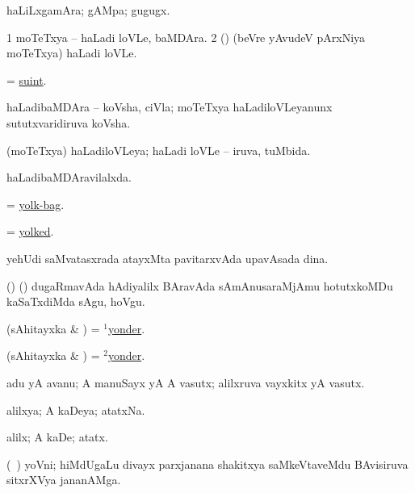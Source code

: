 \bentry
{} 
\gl{\nA} 
\bmng
haLiLxgamAra; gAMpa; gugugx.
\emng
\eentry

\bentry
{}  
\gl{\nA} 
\bmng
\bnum
\num{1} moTeTxya -- haLadi loVLe, baMDAra.
\num{2} (\jiVvi) (beVre yAvudeV pArxNiya moTeTxya) haLadi loVLe.
\enum
\emng 
\eentry

\bentry
{}  
\gl{\nA}
\bmng
= \hyperref{kandict_s.pdf}{S}{suint}{suint}.
\emng 
\eentry

\bentry
{} 
\gl{\nA} 
\bmng
haLadibaMDAra -- koVsha, ciVla; moTeTxya haLadiloVLeyanunx sututxvaridiruva koVsha.
\emng
\eentry

\bentry
{} 
\gl{\gu} 
\bmng
(moTeTxya) haLadiloVLeya; haLadi loVLe -- iruva, tuMbida.
\emng
\eentry

\bentry
{} 
\gl{\gu} 
\bmng
haLadibaMDAravilalxda.
\emng
\eentry

\bentry
{} 
\gl{\nA} 
\bmng
= \hyperlink{yolk-bag}{yolk-bag}.
\emng
\eentry

\bentry
{}  
\gl{\gu} 
\bmng
= \hyperlink{yolked}{yolked}.
\emng
\eentry

\bentry
{} 
\gl{\nA} 
\bmng
yehUdi saMvatasxrada atayxMta pavitarxvAda upavAsada dina.
\emng
\eentry

\bentry
{} 
\gl{\akirx} 
\bmng
(\birx) (\ashi) dugaRmavAda hAdiyalilx BAravAda sAmAnusaraMjAmu hotutxkoMDu kaSaTxdiMda sAgu, hoVgu.
\emng
\eentry

\bentry
{} 
\gl{\gu} 
\bmng
(sAhitayxka \& \pArxM) = \hyperlink{yonder(1)}{$^1$yonder}.
\emng
\eentry


\bentry
{} 
\gl{\kirxvi} 
\bmng
(sAhitayxka \& \pArxM) = \hyperlink{yonder(2)}{$^2$yonder}.
\emng
\eentry

\bentry
{} 
\gl{\sanA} 
\bmng
adu yA avanu; A  manuSayx yA A vasutx; alilxruva vayxkitx yA vasutx.
\emng
\eentry

\bentry
{} 
\gl{\gu}  
\bmng
alilxya; A kaDeya; atatxNa.
\emng
\eentry

\bentry
{} 
\gl{\kirxvi} 
\bmng
alilx; A kaDe; atatx. 
\emng
\eentry

\bentry
{} 
\gl{\nA} 
\bmng
(\bava\ ) 
yoVni; hiMdUgaLu divayx parxjanana  shakitxya saMkeVtaveMdu BAvisiruva sitxrXVya jananAMga.
\emng
\eentry

